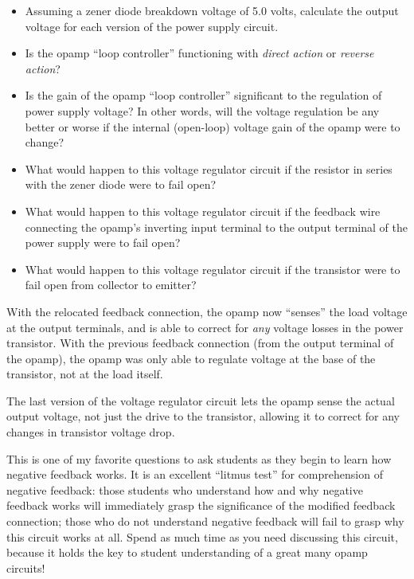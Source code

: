 \begin{itemize}
\item{} Assuming a zener diode breakdown voltage of 5.0 volts, calculate the output voltage for each version of the power supply circuit.
\item{} Is the opamp ``loop controller'' functioning with {\it direct action} or {\it reverse action}?
\item{} Is the gain of the opamp ``loop controller'' significant to the regulation of power supply voltage?  In other words, will the voltage regulation be any better or worse if the internal (open-loop) voltage gain of the opamp were to change?
\item{} What would happen to this voltage regulator circuit if the resistor in series with the zener diode were to fail open?
\item{} What would happen to this voltage regulator circuit if the feedback wire connecting the opamp's inverting input terminal to the output terminal of the power supply were to fail open?
\item{} What would happen to this voltage regulator circuit if the transistor were to fail open from collector to emitter?
\end{itemize}







With the relocated feedback connection, the opamp now ``senses'' the load voltage at the output terminals, and is able to correct for {\it any} voltage losses in the power transistor.  With the previous feedback connection (from the output terminal of the opamp), the opamp was only able to regulate voltage at the base of the transistor, not at the load itself.







The last version of the voltage regulator circuit lets the opamp sense the actual output voltage, not just the drive to the transistor, allowing it to correct for any changes in transistor voltage drop.

\vskip 10pt

This is one of my favorite questions to ask students as they begin to learn how negative feedback works.  It is an excellent ``litmus test'' for comprehension of negative feedback: those students who understand how and why negative feedback works will immediately grasp the significance of the modified feedback connection; those who do not understand negative feedback will fail to grasp why this circuit works at all.  Spend as much time as you need discussing this circuit, because it holds the key to student understanding of a great many opamp circuits!

